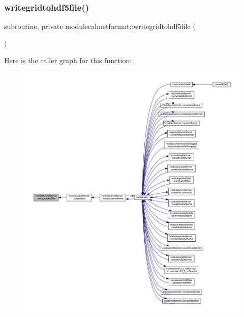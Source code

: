 \mbox{\label{namespacemodulecalmetformat_a49e8d2600dc3c064290f04ab142db105}} 
\subsubsection{\texorpdfstring{writegridtohdf5file()}{writegridtohdf5file()}}
{\footnotesize\ttfamily subroutine, private modulecalmetformat\+::writegridtohdf5file (\begin{DoxyParamCaption}{ }\end{DoxyParamCaption})\hspace{0.3cm}{\ttfamily [private]}}

Here is the caller graph for this function\+:\nopagebreak
\begin{figure}[H]
\begin{center}
\leavevmode
\includegraphics[width=350pt]{namespacemodulecalmetformat_a49e8d2600dc3c064290f04ab142db105_icgraph}
\end{center}
\end{figure}
\mbox{\label{namespacemodulecalmetformat_ab777b0fc84a3a4b2505fadc6db40580f}} 
